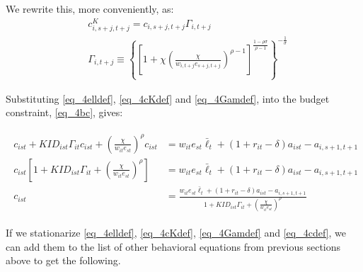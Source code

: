 \documentclass[letterpaper,12pt]{article}
\theoremstyle{definition}
\numberwithin{equation}{section}
\begin{document}
\begin{spacing}{1.5}
	We rewrite this, more conveniently, as:
	\begin{align}
       & c^K_{i,s+j,t+j} = c_{i,s+j,t+j} \Gamma_{i,t+j} \label{eq_4cKdef} \\
       & \Gamma_{i,t+j} \equiv \left\{ \left[1 + \chi \left(\frac{\chi}{w_{i,t+j} e_{s+j,t+j}}\right)^{\rho-1}\right]^{\tfrac{1-\rho \sigma}{\rho-1}}  \right\}^{-\tfrac{1}{\sigma}} \label{eq_4Gamdef}
	\end{align}

	Substituting \eqref{eq_4elldef}, \eqref{eq_4cKdef} and \eqref{eq_4Gamdef}, into the budget constraint, \eqref{eq_4bc},  gives:

	\begin{align}
		\begin{split}
		c_{ist} + KID_{ist}\Gamma_{it} c_{ist} + \left(\frac{\chi}{w_{it}e_{st}}\right)^\rho c_{ist} & = w_{it} e_{st} \bar \ell_t + (1+r_{it}-\delta)a_{ist} - a_{i,s+1,t+1} \\
		c_{ist} \left[ 1 + KID_{ist}\Gamma_{it} + \left(\frac{\chi}{w_{it}e_{st}}\right)^\rho \right] & = w_{it} e_{st} \bar \ell_t + (1+r_{it}-\delta)a_{ist} - a_{i,s+1,t+1} \\
		c_{ist} & = \frac{w_{it} e_{st} \bar \ell_t + (1+r_{it}-\delta)a_{ist} - a_{i,s+1,t+1}} {1 + KID_{ist}\Gamma_{it} + \left(\tfrac{\chi}{w_{it}e_{st}}\right)^\rho} \label{eq_4cdef}
        \end{split}
	\end{align}

	If we stationarize \eqref{eq_4elldef}, \eqref{eq_4cKdef}, \eqref{eq_4Gamdef} and \eqref{eq_4cdef}, we can add them to the list of other behavioral equations from previous sections above to get the following.


\end{spacing}
\end{document}
